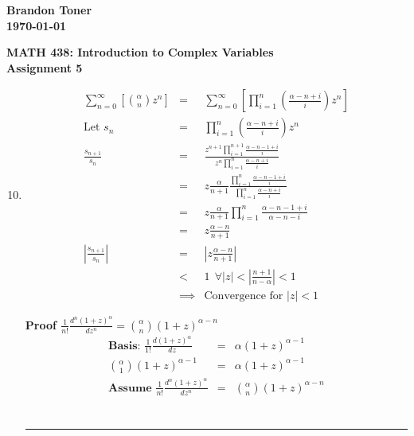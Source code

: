 \documentclass{article}%
\newcommand\abs[1]{\left|#1\right|}
\newenvironment{proof}[1][]{\begin{samepage}\textbf{Proof #1} \\ }{\\ \rule{0.5em}{0.5em} \end{samepage} \\}
\begin{document}
\begin{flushright}
\textbf{Brandon Toner \\
\today}
\end{flushright}

\begin{center}
\textbf{MATH 438: Introduction to Complex Variables \\
Assignment 5} \\
\end{center}

\begin{enumerate}
    \setcounter{enumi}{9}
    \item %
    \begin{eqnarray*}
        \sum\limits_{n=0}^{\infty}\left[{\alpha \choose n}z^n\right] &=& \sum\limits_{n=0}^{\infty}\left[{\prod\limits_{i=1}^{n}{\left(\frac{\alpha-n+i}{i}\right)}}z^n\right] \\
          \text{Let } s_n &=& \prod\limits_{i=1}^{n}{\left(\frac{\alpha-n+i}{i}\right)}z^n \\
        \frac{s_{n+1}}{s_n} &=& \frac{z^{n+1}\prod\limits_{i=1}^{n+1}{\frac{\alpha-n-1+i}{i}}}{z^n\prod\limits_{i=1}^{n}{\frac{\alpha-n+i}{i}}} \\
        &=& z\frac{\alpha}{n+1} \frac{\prod\limits_{i=1}^{n}{\frac{\alpha-n-1+i}{i}}}{\prod\limits_{i=1}^{n}{\frac{\alpha-n+i}{i}}} \\
        &=& z\frac{\alpha}{n+1} \prod\limits_{i=1}^{n}{\frac{\alpha-n-1+i}{\alpha-n-i}} \\
        &=& z \frac{\alpha-n}{n+1} \\
        \abs{\frac{s_{n+1}}{s_n}} &=& \abs{z \frac{\alpha-n}{n+1}} \\
                                  &<& 1 ~~\forall \abs{z} < \abs{\frac{n+1}{n-\alpha}} < 1 \\
                                &\implies& \text{Convergence for } \abs{z}<1
    \end{eqnarray*}
    \begin{proof}[$\frac{1}{n!}\frac{d^n (1+z)^\alpha}{dz^n}={\alpha \choose n}(1+z)^{\alpha-n}$]
        \begin{eqnarray*}
            \textbf{Basis: } \frac{1}{1!}\frac{d (1+z)^\alpha}{dz} &=& \alpha (1+z)^{\alpha-1} \\
            {\alpha \choose 1} (1+z)^{\alpha-1}&=& \alpha (1+z)^{\alpha-1} \\
            \textbf{Assume } \frac{1}{n!}\frac{d^n (1+z)^\alpha}{dz^n}&=&{\alpha \choose n}(1+z)^{\alpha-n} \\

\end{eqnarray*}
\end{proof}
\end{enumerate}
\end{document}
